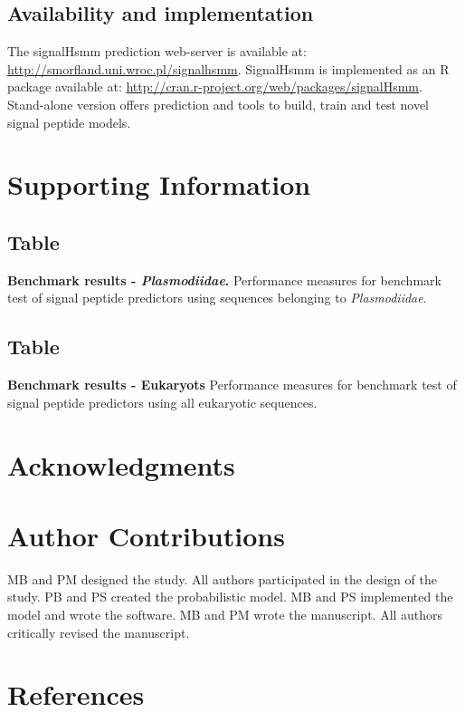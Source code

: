 \documentclass[10pt,letterpaper]{article}
\newcommand{\beginsupplement}{%
        \setcounter{subsection}{0}
        \renewcommand{\thesubsection}{S\arabic{subsection}}
     }
\begin{document}
\subsection*{Availability and implementation}
The signalHsmm prediction web-server is available at: \url{http://smorfland.uni.wroc.pl/signalhsmm}. SignalHsmm is implemented as an R package available at: \url{http://cran.r-project.org/web/packages/signalHsmm}. Stand-alone version offers prediction and tools to build, train and test novel signal peptide models.

\section*{Supporting Information}

\beginsupplement
\subsection{Table}
\label{tab:bench2010plas_full}
{\bf Benchmark results - \textit{Plasmodiidae}.} Performance measures for benchmark test of signal peptide predictors using sequences belonging to \textit{Plasmodiidae}.

\subsection{Table}
\label{tab:bench2010_full}
{\bf Benchmark results - Eukaryots} Performance measures for benchmark test of signal peptide predictors using all eukaryotic sequences.


\section*{Acknowledgments}

\section*{Author Contributions}
MB and PM designed the study. All authors participated in the design of the study. PB and PS created the probabilistic model. MB and PS implemented the model and wrote the software. MB and PM wrote the manuscript. All authors critically revised the manuscript.

\nolinenumbers

\section*{References}
\end{document}
